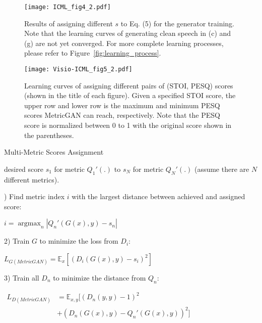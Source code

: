 \documentclass{article}
\begin{document}
\begin{figure*}[ht]
\begin{center}
\centerline{\texttt{[image: ICML\_fig4\_2.pdf]}}
\vskip -0.2in
\caption{Results of assigning different $s$ to Eq. (5) for the generator training. Note that the learning curves of generating clean speech in (c) and (g) are not yet converged. For more complete learning processes, please refer to Figure~\ref{fig:learning_process}.}
\label{fig:demo_different_score}
\end{center}
\vskip -0.2in
\end{figure*}



\begin{figure*}[ht]
\vskip -0.1in
\begin{center}
\centerline{\texttt{[image: Visio-ICML\_fig5\_2.pdf]}}
\vskip -0.2in
\caption{Learning curves of assigning different pairs of (STOI, PESQ) scores (shown in the title of each figure). Given a specified STOI score, the upper row and lower row is the maximum and minimum PESQ scores MetricGAN can reach, respectively. Note that the PESQ score is normalized between 0 to 1 with the original score shown in the parentheses.}
\label{fig:multi-metrics}
\end{center}
\vskip -0.2in
\end{figure*}




\begin{algorithm}[tb]
   \caption{Multi-Metric Scores Assignment}
   \label{alg:multi-metrics}
\begin{algorithmic}
   desired score $s_1$ for metric $Q_1'(.)$ to $s_N$ for metric $Q_N'(.)$ (assume there are $N$ different metrics).
   
   \REPEAT
   ) Find metric index $i$ with the largest distance between achieved and assigned score:
   
   \qquad $i=\operatorname*{argmax}_n |Q_n'(G(x),y)-s_n|$ \vspace{2mm}
   
   2) Train $G$ to minimize the loss from $D_i$:
   
   \qquad $L_{G (MetricGAN)}= \mathbb{E}_{x} [(D_i(G(x), y) - s_i)^2]$ \vspace{2mm}
   
   3) Train all $D_n$ to minimize the distance from $Q_n$: 
    
    \quad $\begin{aligned}
    L_{D (MetricGAN)}&= \mathbb{E}_{x,y} [(D_n(y, y) - 1)^2
    \\ &+(D_n(G(x), y) - Q_n'(G(x), y))^2]
    \end{aligned}$
       
    \end{algorithmic}
    \end{algorithm}
\end{document}
